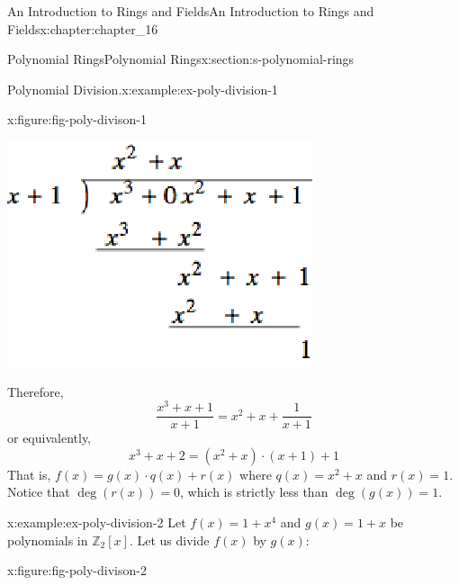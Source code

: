 \documentclass[oneside,10pt,]{book}
\numberwithin{equation}{section}
\begin{document}
\begin{chapterptx}{An Introduction to Rings and Fields}{}{An Introduction to Rings and Fields}{}{}{x:chapter:chapter_16}
\begin{sectionptx}{Polynomial Rings}{}{Polynomial Rings}{}{}{x:section:s-polynomial-rings}
\begin{example}{Polynomial Division.}{x:example:ex-poly-division-1}
\begin{figureptx}{}{x:figure:fig-poly-divison-1}{}
\begin{image}{0.275}{0.45}{0.275}
\includegraphics[width=\linewidth]{images/fig-poly-divison-1.png}
\end{image}%
\tcblower
\end{figureptx}%
Therefore,%
\begin{equation*}
\frac{x^3 + x + 1}{x+ 1}= x^2+ x + \frac{1}{x + 1}
\end{equation*}
or equivalently,%
\begin{equation*}
x^3 + x + 2= \left( x^2+ x\right)\cdot (x+1) + 1
\end{equation*}
That is, \(f(x) = g(x)\cdot q(x) + r(x)\) where \(q(x) = x^2+x\) and \(r(x) = 1\).  Notice that  \(\deg (r(x)) = 0\), which is strictly less than \(\deg (g(x)) = 1\).%
\end{example}
\begin{example}{}{x:example:ex-poly-division-2}%
Let \(f(x) = 1 +x^4\) and \(g(x) = 1 + x\) be polynomials in \(\mathbb{Z}_2[x]\).  Let us divide \(f(x)\) by \(g(x)\):%
\begin{figureptx}{}{x:figure:fig-poly-divison-2}{}%
\begin{image}{0.225}{0.55}{0.225}%

\end{image}
\end{figureptx}
\end{example}
\end{sectionptx}
\end{chapterptx}
\end{document}
